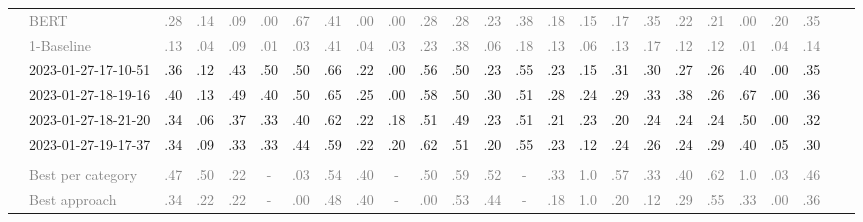 \begin{table*}
\begin{tabular}{@{}ll@{\hspace{10pt}}c@{\hspace{5pt}}cccccccccccccccccccccc@{}}
& \textcolor{gray}{BERT} & \textcolor{gray}{.28} & \textcolor{gray}{.14} & \textcolor{gray}{.09} & \textcolor{gray}{.00} & \textcolor{gray}{.67} & \textcolor{gray}{.41} & \textcolor{gray}{.00} & \textcolor{gray}{.00} & \textcolor{gray}{.28} & \textcolor{gray}{.28} & \textcolor{gray}{.23} & \textcolor{gray}{.38} & \textcolor{gray}{.18} & \textcolor{gray}{.15} & \textcolor{gray}{.17} & \textcolor{gray}{.35} & \textcolor{gray}{.22} & \textcolor{gray}{.21} & \textcolor{gray}{.00} & \textcolor{gray}{.20} & \textcolor{gray}{.35} \\
& \textcolor{gray}{1-Baseline} & \textcolor{gray}{.13} & \textcolor{gray}{.04} & \textcolor{gray}{.09} & \textcolor{gray}{.01} & \textcolor{gray}{.03} & \textcolor{gray}{.41} & \textcolor{gray}{.04} & \textcolor{gray}{.03} & \textcolor{gray}{.23} & \textcolor{gray}{.38} & \textcolor{gray}{.06} & \textcolor{gray}{.18} & \textcolor{gray}{.13} & \textcolor{gray}{.06} & \textcolor{gray}{.13} & \textcolor{gray}{.17} & \textcolor{gray}{.12} & \textcolor{gray}{.12} & \textcolor{gray}{.01} & \textcolor{gray}{.04} & \textcolor{gray}{.14} \\
& 2023-01-27-17-10-51 & .36 & .12 & .43 & .50 & .50 & .66 & .22 & .00 & .56 & .50 & .23 & .55 & .23 & .15 & .31 & .30 & .27 & .26 & .40 & .00 & .35 \\
& 2023-01-27-18-19-16 & .40 & .13 & .49 & .40 & .50 & .65 & .25 & .00 & .58 & .50 & .30 & .51 & .28 & .24 & .29 & .33 & .38 & .26 & .67 & .00 & .36 \\
& 2023-01-27-18-21-20 & .34 & .06 & .37 & .33 & .40 & .62 & .22 & .18 & .51 & .49 & .23 & .51 & .21 & .23 & .20 & .24 & .24 & .24 & .50 & .00 & .32 \\
& 2023-01-27-19-17-37 & .34 & .09 & .33 & .33 & .44 & .59 & .22 & .20 & .62 & .51 & .20 & .55 & .23 & .12 & .24 & .26 & .24 & .29 & .40 & .05 & .30 \\
\addlinespace
\multicolumn{2}{@{}l}{\emph{New York Times}} \\
& \textcolor{gray}{Best per category} & \textcolor{gray}{.47} & \textcolor{gray}{.50} & \textcolor{gray}{.22} & \textcolor{gray}{-} & \textcolor{gray}{.03} & \textcolor{gray}{.54} & \textcolor{gray}{.40} & \textcolor{gray}{-} & \textcolor{gray}{.50} & \textcolor{gray}{.59} & \textcolor{gray}{.52} & \textcolor{gray}{-} & \textcolor{gray}{.33} & \textcolor{gray}{1.0} & \textcolor{gray}{.57} & \textcolor{gray}{.33} & \textcolor{gray}{.40} & \textcolor{gray}{.62} & \textcolor{gray}{1.0} & \textcolor{gray}{.03} & \textcolor{gray}{.46} \\
& \textcolor{gray}{Best approach} & \textcolor{gray}{.34} & \textcolor{gray}{.22} & \textcolor{gray}{.22} & \textcolor{gray}{-} & \textcolor{gray}{.00} & \textcolor{gray}{.48} & \textcolor{gray}{.40} & \textcolor{gray}{-} & \textcolor{gray}{.00} & \textcolor{gray}{.53} & \textcolor{gray}{.44} & \textcolor{gray}{-} & \textcolor{gray}{.18} & \textcolor{gray}{1.0} & \textcolor{gray}{.20} & \textcolor{gray}{.12} & \textcolor{gray}{.29} & \textcolor{gray}{.55} & \textcolor{gray}{.33} & \textcolor{gray}{.00} & \textcolor{gray}{.36} \\

\end{tabular}
\end{table*}
